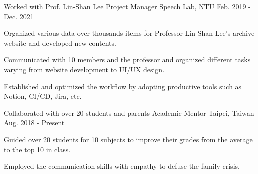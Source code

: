\begin{cventries}

  \cventry
    {Worked with Prof. Lin-Shan Lee} %
    {Project Manager} %
    {Speech Lab, NTU} %
    {Feb. 2019 - Dec. 2021} %
    {
      \begin{cvitems} %
        \item {Organized various data over thousands items for Professor Lin-Shan Lee's archive website and developed new contents.}
        \item Communicated with 10 members and the professor and organized different tasks varying from website development
            to UI/UX design.
        \item {Established and optimized the workflow by adopting productive tools such as Notion, CI/CD, Jira, etc.}
      \end{cvitems}
    }

  \cventry
    {Collaborated with over 20 students and parents} %
    {Academic Mentor} %
    {Taipei, Taiwan} %
    {Aug. 2018 - Present} %
    {
      \begin{cvitems} %
      \item Guided over 20 students for 10 subjects to improve their
          grades from the average to the top 10 in class.
      \item Employed the communication skills with empathy to defuse 
          the family crisis.
      \end{cvitems}
    }

 

\end{cventries}
